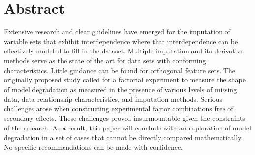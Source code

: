\documentclass[../paper.tex]{subfiles}
\begin{document}
\section{Abstract}

Extensive research and clear guidelines have emerged for the imputation
of variable sets that exhibit interdependence where that interdependence can be effectively modeled to fill in the dataset.
Multiple imputation and its derivative methods serve as the state of the art for
data sets with conforming characteristics. Little guidance can be found
for orthogonal feature sets. The originally proposed study called for a factorial experiment
to measure the shape of model degradation as measured in the presence of various levels of missing data, data relationship characteristics, and imputation methods.
Serious challenges arose when constructing experimental factor combinations free of secondary effects.
These challenges proved insurmountable given the constraints of the research.
As a result, this paper will conclude with an exploration of model degradation in a set of cases that cannot be directly compared mathematically.
No specific recommendations can be made with confidence.
\end{document}

